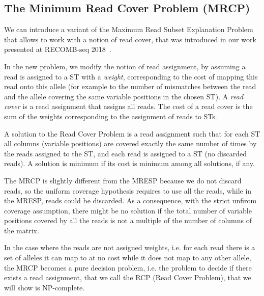 \documentclass[10pt]{llncs}
\begin{document}
\subsection{The Minimum Read Cover Problem (MRCP)}
\label{ssec:MRCP}

We can introduce a variant of the Maximum Read Subset Explanation Problem that allows to work with a notion of read cover, that was introduced in our work presented at RECOMB-seq 2018~\cite{talk/recombseq/GanWCC18,sfu/Gan18}.

In the new problem, we modify the notion of read assignment, by assuming a read is assigned to a ST with a \textit{weight}, corresponding to the cost of mapping this read onto this allele (for example to the number of mismatches between the read and the allele covering the same variable positions in the chosen ST). A \textit{read cover} is a read assignment that assigns all reads. The cost of a read cover is the sum of the weights corresponding to the assignment of reads to STs. 

A solution to the Read Cover Problem is a read assignment such that for each ST all columns (variable positions) are covered exactly the same number of times by the reads assigned to the ST, and each read is assigned to a ST (no discarded reads). A solution is minimum if its cost is minimum among all solutions, if any. 

The MRCP is slightly different from the MRESP because we do not discard reads, so the uniform coverage hypothesis requires to use all the reads, while in the MRESP, reads could be discarded. As a consequence, with the strict unfirom coverage assumption, there might be no solution if the total number of variable positions covered by all the reads is not a multiple of the number of columns of the matrix. 

In the case where the reads are not assigned weights, i.e. for each read there is a set of alleles it can map to at no cost while it does not map to any other allele, the MRCP becomes a pure decision problem, i.e. the problem to decide if there exists a read assignment, that we call the RCP (Read Cover Problem), that we will show is NP-complete.

\end{document}
